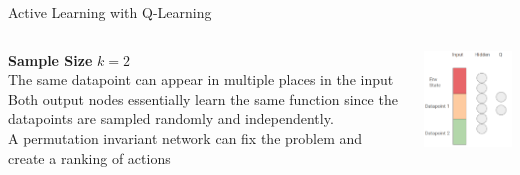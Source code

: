 \documentclass[aspectratio=169, 11pt, invertlogo]{ismll-slides}
\begin{document}
\begin{frame}[fragile]{Active Learning with Q-Learning}
	\begin{columns}
		\begin{column}{.5\linewidth}
			\textbf{Sample Size} $k=2$ \\ [2mm]
			The same datapoint can appear in multiple places in the input \\[2mm]
			Both output nodes essentially learn the same function since the datapoints are sampled randomly and independently. \\ [2mm]
			A permutation invariant network can fix the problem and create a ranking of actions
		\end{column}
		\begin{column}{.4\linewidth}
			\includegraphics[width=160px]{pics/q}
		\end{column}
	\end{columns}
\end{frame}

\end{document}
